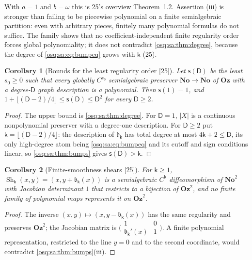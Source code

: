 \documentclass[11pt,letterpaper]{article}
\numberwithin{equation}{section}
\newtheorem{corollary}[corollary]{Corollary}
\theoremstyle{definition}
\theoremstyle{remark}
\theoremstyle{plain}
\newcommand{\No}{\mathbf{No}}
\newcommand{\Oz}{\mathbf{Oz}}
\newcommand{\src}[1]{\textup{\textsf{[#1]}}}
\begin{document}
With $a=1$ and $b=\omega$ this is 25's overview Theorem~1.2. Assertion (iii) is stronger than failing to be piecewise polynomial on a finite
semialgebraic partition: even with arbitrary pieces, finitely many polynomial formulas do not suffice. The family shows that no coefficient-independent finite regularity order forces global
polynomiality; it does not contradict \cref{osq:sa:thm:degree}, because the degree of \eqref{osq:sa:eq:bumpeq} grows with $\mathsf k$ (25).

\begin{corollary}[Bounds for the least regularity order \src{25}]\label{osq:sa:cor:regularity}
Let $\mathsf s(\mathsf D)$ be the least $s_0\ge0$ such that every globally $C^{s_0}$ semialgebraic preserver $\No\to\No$ of $\Oz$ with a degree-$\mathsf D$ graph
description is a polynomial. Then $\mathsf s(1)=1$, and $1+\lfloor(\mathsf D-2)/4\rfloor\le\mathsf s(\mathsf D)\le\mathsf D^2$ for every $\mathsf D\ge2$.
\end{corollary}
\begin{proof}
The upper bound is \cref{osq:sa:thm:degree}. For $\mathsf D=1$, $|X|$ is a continuous nonpolynomial preserver with a degree-one description. For $\mathsf
D\ge2$ put $\mathsf k=\lfloor(\mathsf D-2)/4\rfloor$: the description of $\mathfrak b_{\mathsf k}$ has total degree at most $4\mathsf k+2\le\mathsf D$, its
only high-degree atom being \eqref{osq:sa:eq:bumpeq} and its cutoff and sign conditions linear, so \cref{osq:sa:thm:bumps} gives $\mathsf s(\mathsf D)>\mathsf k$.
\end{proof}

\begin{corollary}[Finite-smoothness shears \src{25}]\label{osq:sa:cor:shears}
For $\mathsf k\ge1$, $\operatorname{Sh}_{\mathsf k}(x,y)=(x,y+\mathfrak b_{\mathsf k}(x))$ is a semialgebraic $C^{\mathsf k}$ diffeomorphism of $\No^2$ with
Jacobian determinant $1$ that restricts to a bijection of $\Oz^2$, and no finite family of polynomial maps represents it on $\Oz^2$.
\end{corollary}
\begin{proof}
The inverse $(x,y)\mapsto(x,y-\mathfrak b_{\mathsf k}(x))$ has the same regularity and preserves $\Oz^2$; the Jacobian matrix is
$\bigl(\begin{smallmatrix}1&0\\\mathfrak b_{\mathsf k}'(x)&1\end{smallmatrix}\bigr)$. A finite polynomial representation, restricted to the line $y=0$ and
to the second coordinate, would contradict \cref{osq:sa:thm:bumps}(iii).
\end{proof}
\end{document}
